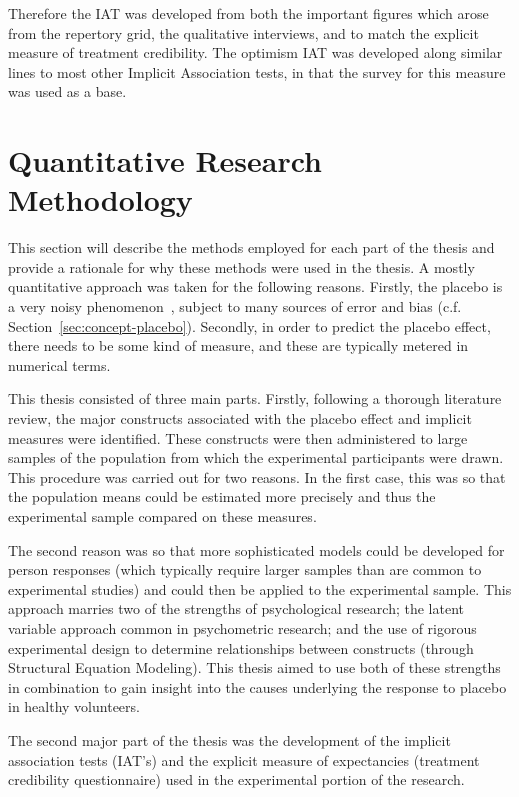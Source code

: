 Therefore the IAT was developed from both the important figures which arose from the repertory grid, the qualitative interviews, and to match the explicit measure of treatment credibility. The optimism IAT was developed along similar lines to most other Implicit Association tests, in that the survey for this measure was used as a base. 


\section{Quantitative Research Methodology}
\label{sec:quant-rese-meth}
This section  will describe the methods employed for each part of the thesis and provide a rationale for why these methods were used in the thesis.
A mostly quantitative approach was taken for the following reasons. Firstly, the placebo  is a very noisy phenomenon~\cite{Singer2005}, subject to many sources of error and bias (c.f. Section~\ref{sec:concept-placebo}). Secondly, in order to predict the placebo effect, there needs to be some kind of measure, and these are typically metered in numerical terms. 

This thesis consisted of three main parts. Firstly, following a thorough literature review, the major constructs associated with the placebo effect and implicit measures were identified. These constructs were then administered to large samples of the population from which the experimental participants were drawn. This procedure was carried out for two reasons. In the first case, this was so that the population means could be estimated more precisely and thus the experimental sample compared on these measures.  

The second reason was so that more sophisticated models could be developed for person responses (which typically require larger samples than are common to experimental studies) and could then be applied to the experimental sample. This approach marries two of the strengths of psychological research; the latent variable approach common in psychometric research; and  the use of rigorous experimental design to determine relationships between constructs (through Structural Equation Modeling). This thesis aimed to use both of these strengths in combination to gain insight into the causes underlying the response to placebo in healthy volunteers.

The second major part of the thesis was the development of the implicit association tests (IAT's) and the explicit measure of expectancies (treatment credibility questionnaire) used in the experimental portion of the research. 

